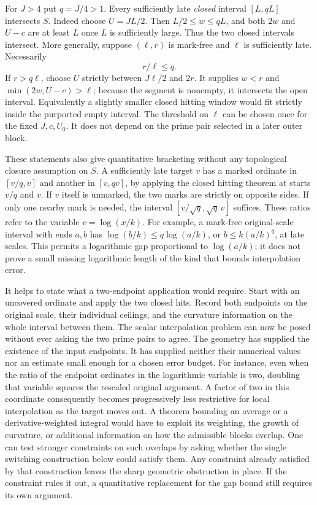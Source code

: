 \documentclass[12pt,letterpaper]{article}
\begin{document}
For \(J>4\) put \(q=J/4>1\). Every sufficiently late \emph{closed} interval \([L,qL]\) intersects \(S\). Indeed choose \(U=JL/2\). Then \(L/2\le w\le qL\), and both \(2w\) and \(U-c\) are at least \(L\) once \(L\) is sufficiently large. Thus the two closed intervals intersect. More generally, suppose \((\ell,r)\) is mark-free and \(\ell\) is sufficiently late. Necessarily
\[
                            r/\ell \le q .
\]
If \(r>q\ell\), choose \(U\) strictly between \(J\ell/2\) and \(2r\). It supplies \(w<r\) and \(\min(2w,U-c)>\ell\); because the segment is nonempty, it intersects the open interval. Equivalently a slightly smaller closed hitting window would fit strictly inside the purported empty interval. The threshold on \(\ell\) can be chosen once for the fixed \(J,c,U_0\). It does not depend on the prime pair selected in a later outer block.

These statements also give quantitative bracketing without any topological closure assumption on \(S\). A sufficiently late target \(v\) has a marked ordinate in \([v/q,v]\) and another in \([v,qv]\), by applying the closed hitting theorem at starts \(v/q\) and \(v\). If \(v\) itself is unmarked, the two marks are strictly on opposite sides. If only one nearby mark is needed, the interval \([v/\sqrt q,\sqrt q\,v]\) suffices. These ratios refer to the variable \(v=\log(x/k)\). For example, a mark-free original-scale interval with ends \(a,b\) has \(\log(b/k)\le q\log(a/k)\), or \(b\le k(a/k)^q\), at late scales. This permits a logarithmic gap proportional to \(\log(a/k)\); it does not prove a small missing logarithmic length of the kind that bounds interpolation error.

It helps to state what a two-endpoint application would require. Start with an uncovered ordinate and apply the two closed hits. Record both endpoints on the original scale, their individual ceilings, and the curvature information on the whole interval between them. The scalar interpolation problem can now be posed without ever asking the two prime pairs to agree. The geometry has supplied the existence of the input endpoints. It has supplied neither their numerical values nor an estimate small enough for a chosen error budget. For instance, even when the ratio of the endpoint ordinates in the logarithmic variable is two, doubling that variable squares the rescaled original argument. A factor of two in this coordinate consequently becomes progressively less restrictive for local interpolation as the target moves out. A theorem bounding an average or a derivative-weighted integral would have to exploit its weighting, the growth of curvature, or additional information on how the admissible blocks overlap. One can test stronger constraints on such overlaps by asking whether the single switching construction below could satisfy them. Any constraint already satisfied by that construction leaves the sharp geometric obstruction in place. If the constraint rules it out, a quantitative replacement for the gap bound still requires its own argument.
\end{document}
